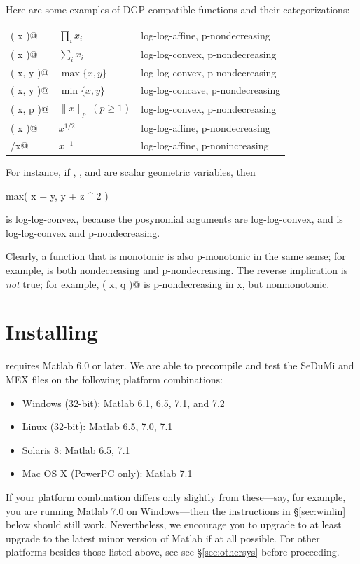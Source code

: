 \documentclass[12pt]{article}
\begin{document}
Here are some examples of DGP-compatible functions and their categorizations:
\begin{center}
\begin{tabular}{lll}
	\verb@prod( x )@    & $\prod_i x_i$& log-log-affine,  p-nondecreasing \\
	\verb@sum( x )@     & $\sum_i x_i$ & log-log-convex,  p-nondecreasing \\
	\verb@max( x, y )@  & $\max\{x,y\}$ & log-log-convex, p-nondecreasing \\
	\verb@min( x, y )@  & $\min\{x,y\}$ & log-log-concave, p-nondecreasing \\
	\verb@norm( x, p )@ & $\|x\|_p~(p\geq 1)$ & log-log-convex,  p-nondecreasing \\ 
	\verb@sqrt( x )@    & $x^{1/2}$    & log-log-affine, p-nondecreasing \\
	\verb@1/x@          & $x^{-1}$     & log-log-affine, p-nonincreasing
\end{tabular}
\end{center}
For instance, if \verb@x@, \verb@y@, and \verb@z@ are scalar geometric variables, then
\begin{code}
	max( x + y, y + z ^ 2 )
\end{code}
is log-log-convex, because the posynomial arguments are log-log-convex, and \verb@max@ is log-log-convex
and p-nondecreasing. 

Clearly, a function that is monotonic is also p-monotonic in the same sense;
for example, \verb@sum@ is both nondecreasing and p-nondecreasing. The
reverse implication is \emph{not} true; for example,
\verb@norm( x, q )@ is p-nondecreasing in x, but nonmonotonic.
\fi

\newpage
\appendix

\section{Installing \cvx}
\label{s-installing}

\cvx requires Matlab 6.0 or later. 
We are able to precompile and test the SeDuMi
and \cvx MEX files on the following platform combinations:
\begin{itemize}
\item Windows (32-bit): Matlab 6.1, 6.5, 7.1, and 7.2
\item Linux (32-bit): Matlab 6.5, 7.0, 7.1
\item Solaris 8: Matlab 6.5, 7.1
\item Mac OS X (PowerPC only): Matlab 7.1
\end{itemize}
If your platform combination differs only slightly from these---say,
for example, you are running Matlab 7.0
on Windows---then the instructions in \S\ref{sec:winlin} below should still work.
Nevertheless, we encourage
you to upgrade to at least upgrade to the latest minor version of
Matlab if at all possible. For other platforms besides those listed above, see
see \S\ref{sec:othersys} before proceeding.
\end{document}

